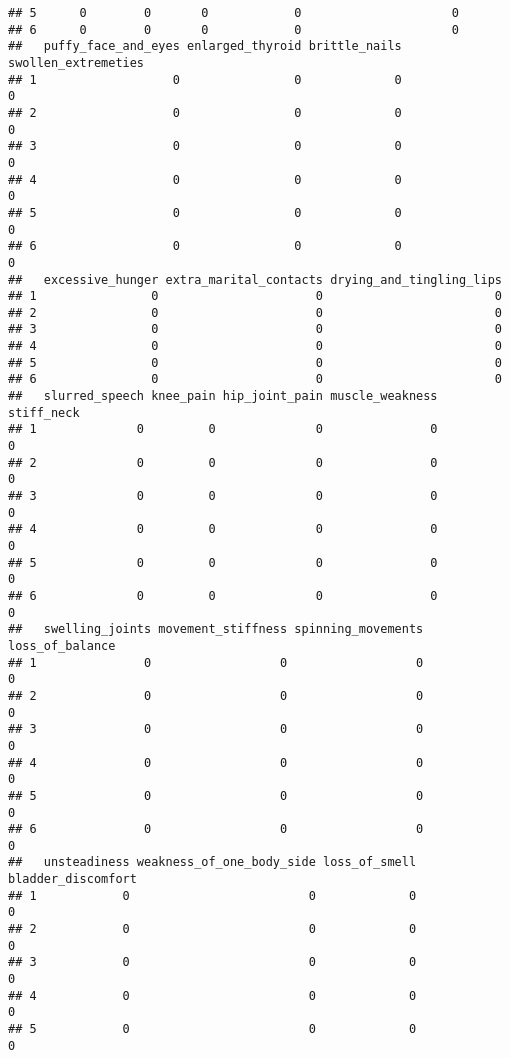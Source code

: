 \documentclass[
]{article}
\begin{document}
\begin{verbatim}
## 5      0        0       0            0                     0
## 6      0        0       0            0                     0
##   puffy_face_and_eyes enlarged_thyroid brittle_nails swollen_extremeties
## 1                   0                0             0                   0
## 2                   0                0             0                   0
## 3                   0                0             0                   0
## 4                   0                0             0                   0
## 5                   0                0             0                   0
## 6                   0                0             0                   0
##   excessive_hunger extra_marital_contacts drying_and_tingling_lips
## 1                0                      0                        0
## 2                0                      0                        0
## 3                0                      0                        0
## 4                0                      0                        0
## 5                0                      0                        0
## 6                0                      0                        0
##   slurred_speech knee_pain hip_joint_pain muscle_weakness stiff_neck
## 1              0         0              0               0          0
## 2              0         0              0               0          0
## 3              0         0              0               0          0
## 4              0         0              0               0          0
## 5              0         0              0               0          0
## 6              0         0              0               0          0
##   swelling_joints movement_stiffness spinning_movements loss_of_balance
## 1               0                  0                  0               0
## 2               0                  0                  0               0
## 3               0                  0                  0               0
## 4               0                  0                  0               0
## 5               0                  0                  0               0
## 6               0                  0                  0               0
##   unsteadiness weakness_of_one_body_side loss_of_smell bladder_discomfort
## 1            0                         0             0                  0
## 2            0                         0             0                  0
## 3            0                         0             0                  0
## 4            0                         0             0                  0
## 5            0                         0             0                  0

\end{verbatim}
\end{document}
